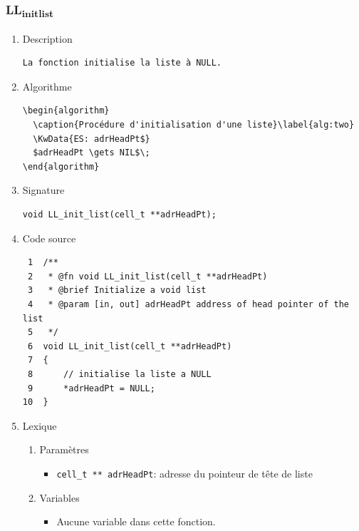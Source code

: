 \documentclass[11pt]{article}
\begin{document}
\subsubsection{LL\textsubscript{init}\textsubscript{list}}
\label{sec:org1405ec5}
\begin{enumerate}
\item Description
\label{sec:org77d09cc}

\begin{verbatim}
La fonction initialise la liste à NULL.
\end{verbatim}

\item Algorithme
\label{sec:org619528c}

\begin{verbatim}
\begin{algorithm}
  \caption{Procédure d'initialisation d'une liste}\label{alg:two}
  \KwData{ES: adrHeadPt$}
  $adrHeadPt \gets NIL$\;
\end{algorithm}
\end{verbatim}

\item Signature
\label{sec:org81064df}

\begin{verbatim}
void LL_init_list(cell_t **adrHeadPt);
\end{verbatim}

\item Code source
\label{sec:org2a071c5}

\begin{verbatim}
 1  /**
 2   * @fn void LL_init_list(cell_t **adrHeadPt)
 3   * @brief Initialize a void list
 4   * @param [in, out] adrHeadPt address of head pointer of the list 
 5   */
 6  void LL_init_list(cell_t **adrHeadPt)
 7  {
 8      // initialise la liste a NULL
 9      *adrHeadPt = NULL;
10  }
\end{verbatim}

\item Lexique
\label{sec:org385b35a}
\begin{enumerate}
\item Paramètres
\label{sec:org4817ee6}
\begin{itemize}
\item \texttt{cell\_t ** adrHeadPt}: adresse du pointeur de tête de liste
\end{itemize}
\item Variables
\label{sec:orge0327e9}
\begin{itemize}
\item Aucune variable dans cette fonction.
\end{itemize}
\end{enumerate}
\end{enumerate}
\end{document}
